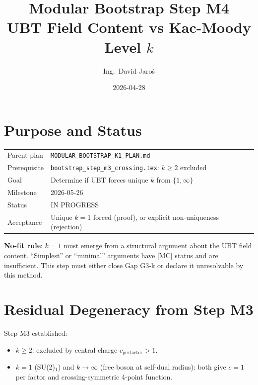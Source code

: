 \documentclass[12pt,a4paper]{article}
\title{\textbf{Modular Bootstrap Step M4}\\
         \large UBT Field Content vs Kac-Moody Level $k$}
\author{Ing.\ David Jaro\v{s}}
\date{2026-04-28}
\theoremstyle{definition}
\theoremstyle{remark}
\begin{document}
  \maketitle
\fi

\section{Purpose and Status}
\label{sec:m4:purpose}

\begin{tcolorbox}[colback=blue!4!white, colframe=blue!50!black,
                  title=Step M4 — UBT Field Content vs $k$ Values]
\begin{tabular}{ll}
Parent plan  & \texttt{MODULAR\_BOOTSTRAP\_K1\_PLAN.md} \\
Prerequisite & \texttt{bootstrap\_step\_m3\_crossing.tex}: $k \geq 2$ excluded \\
Goal         & Determine if UBT forces unique $k$ from $\{1, \infty\}$ \\
Milestone    & 2026-05-26 \\
Status       & IN PROGRESS \\
Acceptance   & Unique $k = 1$ forced (proof), or explicit non-uniqueness (rejection) \\
\end{tabular}
\end{tcolorbox}

\begin{warnbox}
\textbf{No-fit rule}: $k = 1$ must emerge from a structural argument about
the UBT field content.  ``Simplest'' or ``minimal'' arguments have [MC] status
and are insufficient.  This step must either close Gap G3-k or declare it
unresolvable by this method.
\end{warnbox}

\section{Residual Degeneracy from Step M3}
\label{sec:m4:degeneracy}

Step M3 established:
\begin{itemize}
  \item $k \geq 2$: excluded by central charge $c_{\mathrm{per\,factor}} > 1$.
  \item $k = 1$ (SU(2)$_1$) and $k \to \infty$ (free boson at self-dual radius):
        both give $c = 1$ per factor and crossing-symmetric 4-point function.
\end{itemize}
\end{document}
